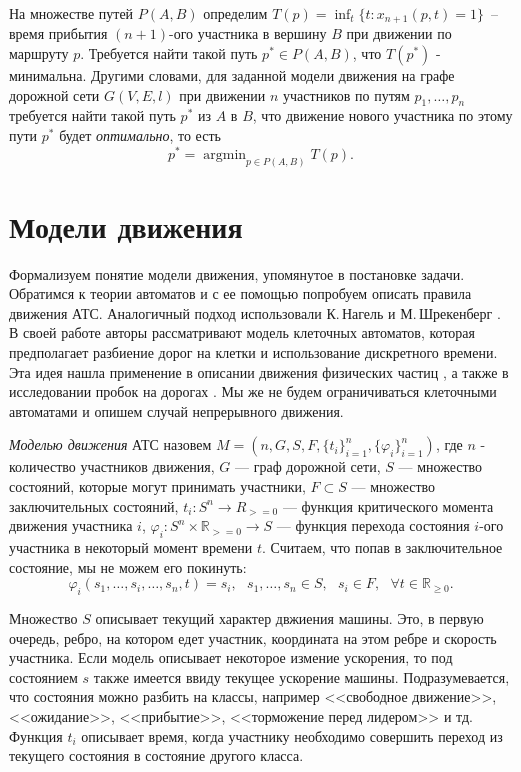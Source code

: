 \documentclass[12pt, a4paper]{article}
\DeclareMathOperator*{\argmin}{argmin}
\begin{document}
На множестве путей $P(A,B)$ определим $T(p) = \displaystyle \inf_t \{t : x_{n+1}(p, t) = 1\}$~-- время прибытия $(n+1)$-ого участника в вершину $B$ при движении по маршруту $p$. Требуется найти такой путь $p^* \in P(A, B)$, что $T(p^*)$ - минимальна. Другими словами, для заданной модели движения на графе дорожной сети $G(V, E, l)$ при движении $n$ участников по путям $p_1, \dots, p_n$ требуется найти такой путь $p^*$ из $A$ в $B$, что движение нового участника по этому пути $p^*$ будет \textit{оптимально}, то есть
$$p^* = \argmin_{p \in P(A, B)} T(p).$$

\newpage
\section{Модели движения}

Формализуем понятие модели движения, упомянутое в постановке задачи. Обратимся к теории автоматов и с ее помощью попробуем описать правила движения АТС. Аналогичный подход использовали К.\,Нагель и М.\,Шрекенберг \cite{automat_baza}. В своей работе авторы рассматривают модель клеточных автоматов, которая предполагает разбиение дорог на клетки и использование дискретного времени. Эта идея нашла применение в описании движения физических частиц \cite{automat_phyz}, а также в исследовании пробок на дорогах \cite{automat_jam}. Мы же не будем ограничиваться клеточными автоматами и опишем случай непрерывного движения.

\textit{Моделью движения} АТС назовем $M = \left(n, G, S, F, \{t_i\}_{i = 1}^n, \{\varphi_i\}_{i = 1}^n \right)$, где $n$ - количество участников движения, $G$ --- граф дорожной сети, $S$ --- множество состояний, которые могут принимать участники, $F \subset S$ --- множество заключительных состояний, $t_i: S^n \rightarrow R_{>=0}$ --- функция критического момента движения участника $i$, $\varphi_i: S^n \times \mathbb{R}_{>= 0} \rightarrow S$ --- функция перехода состояния $i$-ого участника в некоторый момент времени $t$. Считаем, что попав в заключительное состояние, мы не можем его покинуть:
$$\varphi_i (s_1, \dots, s_i, \dots, s_n, t) = s_i, \text{ } s_1, \dots, s_n \in S, \text{ } s_i \in F, \text{ } \forall t \in \mathbb{R}_{\ge 0}.$$

Множество $S$ описывает текущий характер двжиения машины. Это, в первую очередь, ребро, на котором едет участник, координата на этом ребре и скорость участника. Если модель описывает некоторое измение ускорения, то под состоянием $s$ также имеется ввиду текущее ускорение машины. Подразумевается, что состояния можно разбить на классы, например <<свободное движение>>, <<ожидание>>, <<прибытие>>, <<торможение перед лидером>> и тд. Функция $t_i$ описывает время, когда участнику необходимо совершить переход из текущего состояния в состояние другого класса. 
\end{document}
